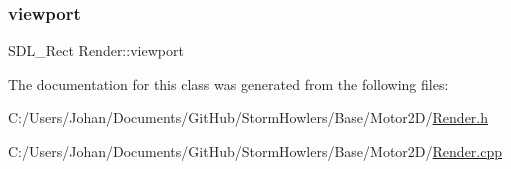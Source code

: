 \subsubsection{\texorpdfstring{viewport}{viewport}}
{\footnotesize\ttfamily S\+D\+L\+\_\+\+Rect Render\+::viewport}



The documentation for this class was generated from the following files\+:\begin{DoxyCompactItemize}
\item 
C\+:/\+Users/\+Johan/\+Documents/\+Git\+Hub/\+Storm\+Howlers/\+Base/\+Motor2\+D/\mbox{\hyperlink{_render_8h}{Render.\+h}}\item 
C\+:/\+Users/\+Johan/\+Documents/\+Git\+Hub/\+Storm\+Howlers/\+Base/\+Motor2\+D/\mbox{\hyperlink{_render_8cpp}{Render.\+cpp}}\end{DoxyCompactItemize}
